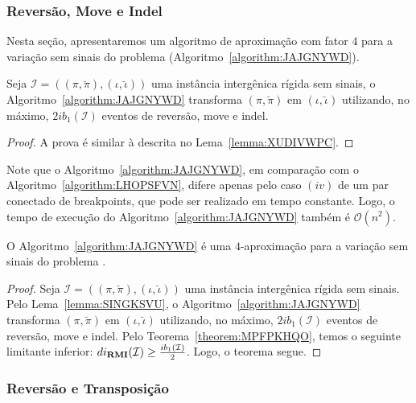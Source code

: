 \subsubsection{Reversão, Move e Indel}

Nesta seção, apresentaremos um algoritmo de aproximação com fator $4$ para a variação sem sinais do problema \SbIRMI{} (Algoritmo~\ref{algorithm:JAJGNYWD}).



\begin{lemma}\label{lemma:SINGKSVU}
Seja $\mathcal{I} = ((\pi,\breve\pi),(\iota,\breve\iota))$ uma instância intergênica rígida sem sinais, o Algoritmo~\ref{algorithm:JAJGNYWD} transforma $(\pi,\breve\pi)$ em $(\iota,\breve\iota)$ utilizando, no máximo, $2ib_1(\mathcal{I})$ eventos de reversão, move e indel.
\end{lemma}
\begin{proof}
  A prova é similar à descrita no Lema~\ref{lemma:XUDIVWPC}.
\end{proof}

Note que o Algoritmo~\ref{algorithm:JAJGNYWD}, em comparação com o Algoritmo~\ref{algorithm:LHOPSFVN}, difere apenas pelo caso $(iv)$ de um par conectado de breakpoints, que pode ser realizado em tempo constante. Logo, o tempo de execução do Algoritmo~\ref{algorithm:JAJGNYWD} também é $\mathcal{O}(n^2)$.

\begin{theorem}\label{theorem:WSCHLXXJ}
O Algoritmo~\ref{algorithm:JAJGNYWD} é uma $4$-aproximação para a variação sem sinais do problema \SbIRMI{}.
\end{theorem}
\begin{proof}
Seja $\mathcal{I}=((\pi,\breve\pi),(\iota,\breve\iota))$ uma instância intergênica rígida sem sinais. Pelo Lema~\ref{lemma:SINGKSVU}, o Algoritmo~\ref{algorithm:JAJGNYWD} transforma $(\pi,\breve\pi)$ em $(\iota,\breve\iota)$ utilizando, no máximo, $2ib_1(\mathcal{I})$ eventos de reversão, move e indel. Pelo Teorema~\ref{theorem:MPFPKHQO}, temos o seguinte limitante inferior: $di_{\textbf{RMI}}(\mathcal{I}) \ge \frac{ib_1(\mathcal{I})}{2}$. Logo, o teorema segue. 
\end{proof}

\subsubsection{Reversão e Transposição}

